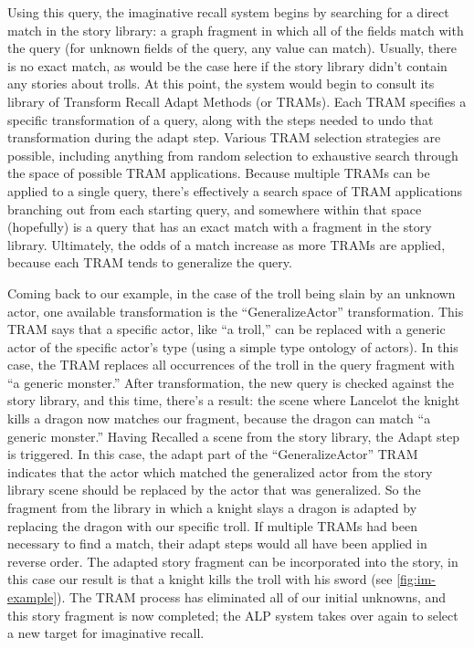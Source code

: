 Using this query, the imaginative recall system begins by searching for a direct match in the story library: a graph fragment in which all of the fields match with the query (for unknown fields of the query, any value can match).
%
Usually, there is no exact match, as would be the case here if the story library didn't contain any stories about trolls.
%
At this point, the system would begin to consult its library of Transform Recall Adapt Methods (or TRAMs).
%
Each TRAM specifies a specific transformation of a query, along with the steps needed to undo that transformation during the adapt step.
%
Various TRAM selection strategies are possible, including anything from random selection to exhaustive search through the space of possible TRAM applications.
%
Because multiple TRAMs can be applied to a single query, there's effectively a search space of TRAM applications branching out from each starting query, and somewhere within that space (hopefully) is a query that has an exact match with a fragment in the story library.
%
Ultimately, the odds of a match increase as more TRAMs are applied, because each TRAM tends to generalize the query.


Coming back to our example, in the case of the troll being slain by an unknown actor, one available transformation is the ``GeneralizeActor'' transformation.
%
This TRAM says that a specific actor, like ``a troll,'' can be replaced with a generic actor of the specific actor's type (using a simple type ontology of actors).
%
In this case, the TRAM replaces all occurrences of the troll in the query fragment with ``a generic monster.''
%
After transformation, the new query is checked against the story library, and this time, there's a result: the scene where Lancelot the knight kills a dragon now matches our fragment, because the dragon can match ``a generic monster.''
%
Having Recalled a scene from the story library, the Adapt step is triggered.
%
In this case, the adapt part of the ``GeneralizeActor'' TRAM indicates that the actor which matched the generalized actor from the story library scene should be replaced by the actor that was generalized.
%
So the fragment from the library in which a knight slays a dragon is adapted by replacing the dragon with our specific troll.
%
If multiple TRAMs had been necessary to find a match, their adapt steps would all have been applied in reverse order.
%
The adapted story fragment can be incorporated into the story, in this case our result is that a knight kills the troll with his sword (see \cref{fig:im-example}).
%
The TRAM process has eliminated all of our initial unknowns, and this story fragment is now completed; the ALP system takes over again to select a new target for imaginative recall.

